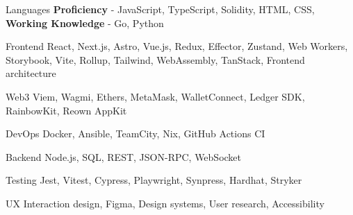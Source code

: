 

\begin{cvskills}

  \cvskill
    {Languages} %
    {\textbf{Proficiency} - JavaScript, TypeScript, Solidity, HTML, CSS, \textbf{Working Knowledge} - Go, Python} %

  \cvskill
    {Frontend} %
    {React, Next.js, Astro, Vue.js, Redux, Effector, Zustand, Web Workers, Storybook, Vite, Rollup, Tailwind, WebAssembly, TanStack, Frontend architecture} %

  \cvskill
    {Web3} %
    {Viem, Wagmi, Ethers, MetaMask, WalletConnect, Ledger SDK, RainbowKit, Reown AppKit} %

  \cvskill
    {DevOps} %
    {Docker, Ansible, TeamCity, Nix, GitHub Actions CI} %

  \cvskill
    {Backend} %
    {Node.js, SQL, REST, JSON-RPC, WebSocket} %

  \cvskill
    {Testing} %
    {Jest, Vitest, Cypress, Playwright, Synpress, Hardhat, Stryker} %

  \cvskill
    {UX} %
    {Interaction design, Figma, Design systems, User research, Accessibility} %

\end{cvskills}
